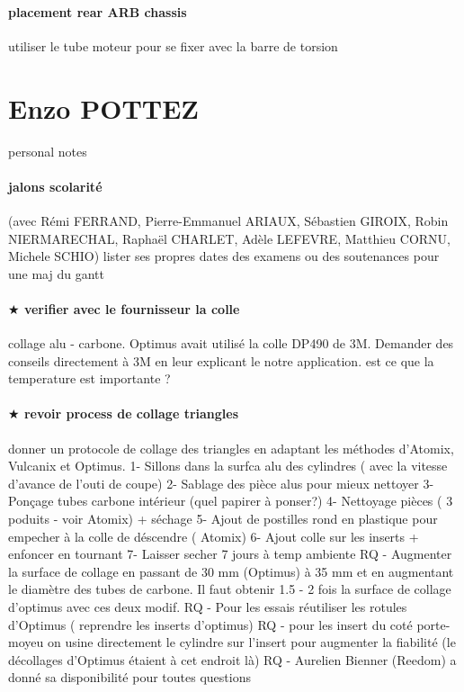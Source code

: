 \paragraph{placement rear ARB chassis} utiliser le tube moteur pour se fixer avec la barre de torsion

 
 \newpage \section*{Enzo POTTEZ} 
 \par personal notes
\paragraph{jalons scolarité} (avec Rémi FERRAND, Pierre-Emmanuel ARIAUX, Sébastien GIROIX, Robin NIERMARECHAL, Raphaël CHARLET, Adèle LEFEVRE, Matthieu CORNU, Michele SCHIO) lister ses propres dates des examens ou des soutenances pour une maj du gantt
\paragraph{$\bigstar$ verifier avec le fournisseur la colle} collage alu - carbone. Optimus avait utilisé la colle DP490 de 3M. Demander des conseils directement à 3M en leur explicant le notre application. est ce que la temperature est importante ?
\paragraph{$\bigstar$ revoir process de collage triangles} donner un protocole de collage des triangles en adaptant les méthodes d'Atomix, Vulcanix et Optimus. 
1- Sillons dans la surfca alu des cylindres ( avec la vitesse d'avance de l'outi de coupe) 
2- Sablage des pièce alus pour mieux nettoyer
3- Ponçage tubes carbone intérieur (quel papirer à ponser?)
4- Nettoyage pièces ( 3 poduits - voir Atomix) + séchage
5- Ajout de postilles rond en plastique pour empecher à la colle de déscendre ( Atomix)
6- Ajout colle sur les inserts + enfoncer en tournant
7- Laisser secher 7 jours à temp ambiente
RQ - Augmenter la surface de collage en passant de 30 mm (Optimus) à 35 mm et en augmentant le diamètre des tubes de carbone. Il faut obtenir 1.5 - 2 fois la surface de collage d'optimus avec ces deux modif.
RQ - Pour les essais réutiliser les rotules d'Optimus ( reprendre les inserts d'optimus)
RQ - pour les insert du coté porte-moyeu on usine directement le cylindre sur l'insert pour augmenter la fiabilité (le décollages d'Optimus étaient à cet endroit là)
RQ - Aurelien Bienner (Reedom) a donné sa disponibilité pour toutes questions
